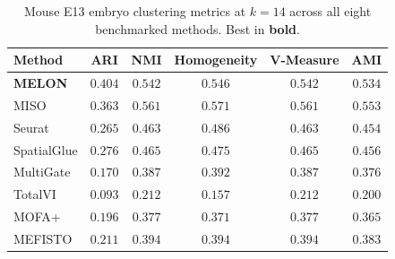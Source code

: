 \documentclass{article}
\theoremstyle{plain}
\theoremstyle{definition}
\begin{document}
\begin{table}[!htbp]
\centering
\caption{Mouse E13 embryo clustering metrics at $k{=}14$ across all eight benchmarked methods. Best in \textbf{bold}.}
\label{tab:dataset3_metrics}
\small
\begin{tabular}{lccccc}
\toprule
Method & ARI & NMI & Homogeneity & V-Measure & AMI \\
\midrule
\textbf{MELON}  & $\mathbf{0.404}$ & $0.542$ & $0.546$ & $0.542$ & $0.534$ \\
MISO            & $0.363$ & $\mathbf{0.561}$ & $\mathbf{0.571}$ & $\mathbf{0.561}$ & $\mathbf{0.553}$ \\
Seurat          & $0.265$ & $0.463$ & $0.486$ & $0.463$ & $0.454$ \\
SpatialGlue     & $0.276$ & $0.465$ & $0.475$ & $0.465$ & $0.456$ \\
MultiGate       & $0.170$ & $0.387$ & $0.392$ & $0.387$ & $0.376$ \\
TotalVI         & $0.093$ & $0.212$ & $0.157$ & $0.212$ & $0.200$ \\
MOFA+           & $0.196$ & $0.377$ & $0.371$ & $0.377$ & $0.365$ \\
MEFISTO         & $0.211$ & $0.394$ & $0.394$ & $0.394$ & $0.383$ \\
\bottomrule
\end{tabular}
\end{table}
\end{document}
